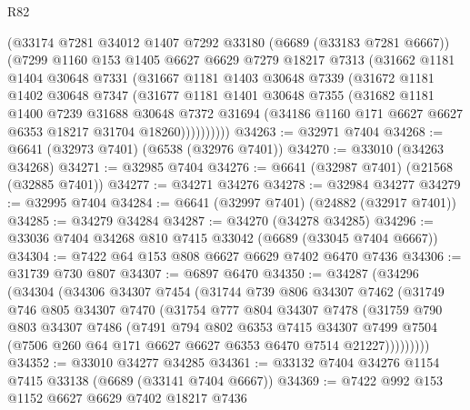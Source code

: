 \begin{lexlean}{R82}
\begin{coremodule}
        (@33174
          @7281
          @34012
          @1407
          @7292
          @33180
          (@6689 (@33183 @7281 @6667))
          (@7299
            @1160
            @153
            @1405
            @6627
            @6629
            @7279
            @18217
            @7313
            (@31662
              @1181
              @1404
              @30648
              @7331
              (@31667
                @1181
                @1403
                @30648
                @7339
                (@31672
                  @1181
                  @1402
                  @30648
                  @7347
                  (@31677
                    @1181
                    @1401
                    @30648
                    @7355
                    (@31682
                      @1181
                      @1400
                      @7239
                      @31688
                      @30648
                      @7372
                      @31694
                      (@34186 @1160 @171 @6627 @6627 @6353 @18217 @31704 @18260))))))))))
@34263 := @32971 @7404
@34268 := @6641 (@32973 @7401) (@6538 (@32976 @7401))
@34270 := @33010 (@34263 @34268)
@34271 := @32985 @7404
@34276 := @6641 (@32987 @7401) (@21568 (@32885 @7401))
@34277 := @34271 @34276
@34278 := @32984 @34277
@34279 := @32995 @7404
@34284 := @6641 (@32997 @7401) (@24882 (@32917 @7401))
@34285 := @34279 @34284
@34287 := @34270 (@34278 @34285)
@34296 := @33036 @7404 @34268 @810 @7415 @33042 (@6689 (@33045 @7404 @6667))
@34304 := @7422 @64 @153 @808 @6627 @6629 @7402 @6470 @7436
@34306 := @31739 @730 @807
@34307 := @6897 @6470
@34350 := @34287
    (@34296
      (@34304
        (@34306
          @34307
          @7454
          (@31744
            @739
            @806
            @34307
            @7462
            (@31749
              @746
              @805
              @34307
              @7470
              (@31754
                @777
                @804
                @34307
                @7478
                (@31759
                  @790
                  @803
                  @34307
                  @7486
                  (@7491
                    @794
                    @802
                    @6353
                    @7415
                    @34307
                    @7499
                    @7504
                    (@7506 @260 @64 @171 @6627 @6627 @6353 @6470 @7514 @21227)))))))))
@34352 := @33010 @34277 @34285
@34361 := @33132 @7404 @34276 @1154 @7415 @33138 (@6689 (@33141 @7404 @6667))
@34369 := @7422 @992 @153 @1152 @6627 @6629 @7402 @18217 @7436

\end{coremodule}
\end{lexlean}
